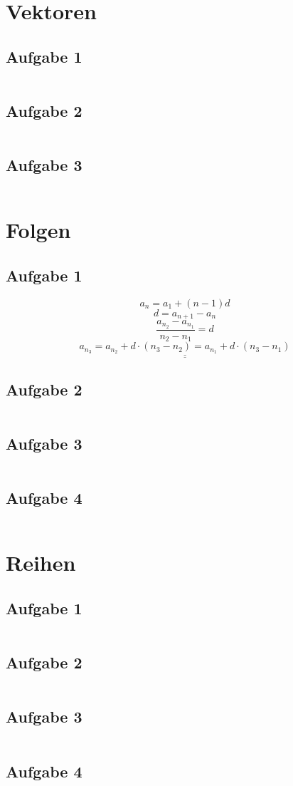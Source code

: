 \section{Vektoren}
\subsection{Aufgabe 1}
\[  \]
\[  \]
\[  \]

\subsection{Aufgabe 2}
\[  \]
\[  \]
\[  \]

\subsection{Aufgabe 3}
\[  \]
\[  \]
\[  \]

\section{Folgen}
\subsection{Aufgabe 1}
\[ a_n = a_1 + (n - 1)d \]
\[ d = a_{n+1} - a_n \]
\[ \frac{a_{n_2} - a_{n_1}}{n_2 - n_1} = d  \]
\[ \underline{\underline{a_{n_3} = a_{n_2} + d \cdot (n_3 - n_2) = a_{n_1} + d \cdot (n_3 - n_1)}} \]

\subsection{Aufgabe 2}
\[  \]
\[  \]
\[  \]

\subsection{Aufgabe 3}
\[  \]
\[  \]
\[  \]

\subsection{Aufgabe 4}
\[  \]
\[  \]
\[  \]

\section{Reihen}
\subsection{Aufgabe 1}
\[  \]
\[  \]
\[  \]

\subsection{Aufgabe 2}
\[  \]
\[  \]
\[  \]

\subsection{Aufgabe 3}
\[  \]
\[  \]
\[  \]

\subsection{Aufgabe 4}
\[  \]
\[  \]
\[  \]
